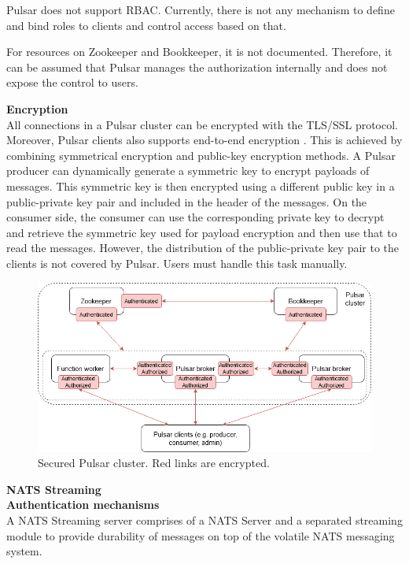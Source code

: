 Pulsar does not support RBAC. Currently, there is not any mechanism to define and bind roles to clients and control access based on that.

For resources on Zookeeper and Bookkeeper, it is not documented. Therefore, it can be assumed that Pulsar manages the authorization internally and does not expose the control to users. 

\textbf{Encryption}\\
All connections in a Pulsar cluster can be encrypted with the TLS/SSL protocol. Moreover, Pulsar clients also supports end-to-end encryption \cite{pulsarsecurity}. This is achieved by combining symmetrical encryption and public-key encryption methods. A Pulsar producer can dynamically generate a symmetric key to encrypt payloads of messages. This symmetric key is then encrypted using a different public key in a public-private key pair and included in the header of the messages. On the consumer side, the consumer can use the corresponding private key to decrypt and retrieve the symmetric key used for payload encryption and then use that to read the messages. However, the distribution of the public-private key pair to the clients is not covered by Pulsar. Users must handle this task manually. 

\begin{figure}[h]
	\centering
	\includegraphics[width=\linewidth]{images/security-pulsar.png}
	\caption{Secured Pulsar cluster. Red links are encrypted.}
	\label{fig:securitypulsar}
\end{figure} 

\large \textbf{NATS Streaming}\\
\normalsize
\textbf{Authentication mechanisms}\\
A NATS Streaming server comprises of a NATS Server and a separated streaming module to provide durability of messages on top of the volatile NATS messaging system. 

